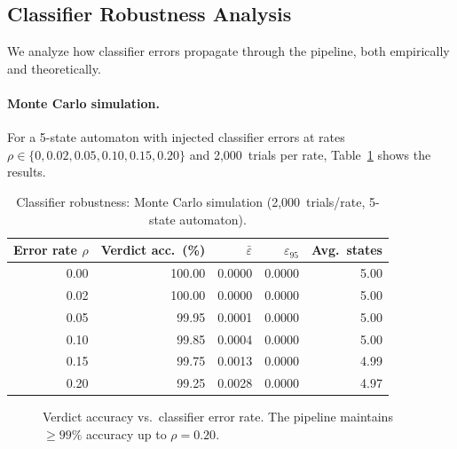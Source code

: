 \documentclass[11pt]{article}
\begin{document}
\subsection{Classifier Robustness Analysis}\label{sec:robustness}

We analyze how classifier errors propagate through the pipeline, both
empirically and theoretically.

\paragraph{Monte Carlo simulation.}
For a 5-state automaton with injected classifier errors at rates
$\rho \in \{0, 0.02, 0.05, 0.10, 0.15, 0.20\}$ and 2{,}000~trials
per rate, Table~\ref{tab:robustness} shows the results.

\begin{table}[t]
\centering
\caption{Classifier robustness: Monte Carlo simulation
  (2{,}000~trials/rate, 5-state automaton).}
\label{tab:robustness}
\small
\begin{tabular}{@{}rrrrr@{}}
\toprule
Error rate $\rho$ & Verdict acc.\ (\%) & $\bar{\varepsilon}$ & $\varepsilon_{95}$ & Avg.\ states \\
\midrule
0.00 & 100.00 & 0.0000 & 0.0000 & 5.00 \\
0.02 & 100.00 & 0.0000 & 0.0000 & 5.00 \\
0.05 & 99.95 & 0.0001 & 0.0000 & 5.00 \\
0.10 & 99.85  & 0.0004 & 0.0000 & 5.00 \\
0.15 & 99.75  & 0.0013 & 0.0000 & 4.99 \\
0.20 & 99.25  & 0.0028 & 0.0000 & 4.97 \\
\bottomrule
\end{tabular}
\end{table}

\begin{figure}[t]
\centering
{}
\caption{Verdict accuracy vs.\ classifier error rate.  The pipeline
  maintains ${\ge}99\%$ accuracy up to $\rho = 0.20$.}
\label{fig:robustness}
\end{figure}
\end{document}
